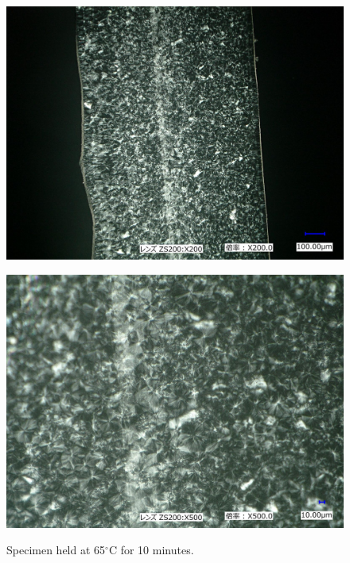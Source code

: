 \begin{figure}[htbp]
    \begin{minipage}[htbp]{0.45\linewidth}
      \centering
      \includegraphics[keepaspectratio, scale=0.1]{Data/観察結果/65_10min_200.jpg}
      \label{fig:65度200}
    \end{minipage}
    \begin{minipage}[htbp]{0.45\linewidth}
      \centering
      \includegraphics[keepaspectratio, scale=0.1]{Data/観察結果/65_10min_500.jpg}
      \label{fig:65度500}
    \end{minipage}
    \centering
    \caption{Specimen held at 65$^\circ$C for 10 minutes.}
    \label{fig:65度}
\end{figure}

